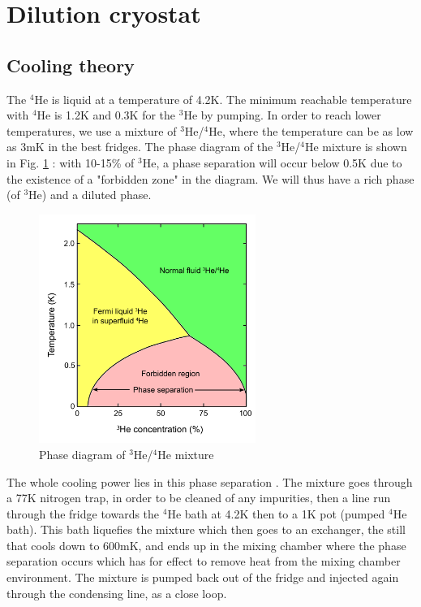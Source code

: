             
            \section{Dilution cryostat}
            
            \subsection{Cooling theory}    
            The $^4$He is liquid at a temperature of 4.2K. The minimum reachable temperature with $^4$He is 1.2K and 0.3K for the $^3$He by pumping. In order to reach lower temperatures, we use a mixture of $^3$He/$^4$He, where the temperature can be as low as 3mK in the best fridges. The phase diagram of the $^3$He/$^4$He mixture is shown in Fig. \ref{phasediagram} : with 10-15\% of $^3$He, a phase separation will occur below 0.5K due to the existence of a "forbidden zone" in the diagram. We will thus have a rich phase (of $^3$He) and a diluted phase. 
        
        \begin{figure}
            \centering
            \includegraphics[width=200pt]{phasediagram.png}
            \caption{Phase diagram of $^3$He/$^4$He mixture}
            \label{phasediagram}
        \end{figure}
        
The whole cooling power lies in this phase separation \cite{fridge}. The mixture goes through a 77K nitrogen trap, in order to be cleaned of any impurities, then a line run through the fridge towards the $^4$He bath at 4.2K then to a 1K pot (pumped $^4$He bath). This bath liquefies the mixture which then goes to an exchanger, the still that cools down to 600mK, and ends up in the mixing chamber where the phase separation occurs which has for effect to remove heat from the mixing chamber environment. The mixture is pumped back out of the fridge and injected again through the condensing line, as a close loop.

